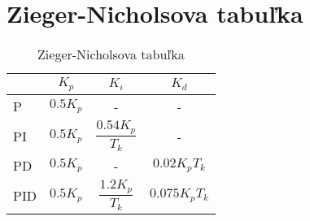 \chapter{Zieger-Nicholsova tabuľka}
\begin{table}[h]
\centering
\label{tab:Zieger-Nichols}
\begin{tabular}{|m{2cm}|c|c|c|}
\hline
 & \textbf{$K_p$} & \textbf{$K_i$} & \textbf{$K_d$}\\
\hline
P & $0.5K_p$ & - & - \\
PI & $0.5K_p$ & $\dfrac{0.54K_p}{T_k}$ & - \\
PD & $0.5K_p$ & - & $0.02K_pT_k$ \\
PID & $0.5K_p$ & $\dfrac{1.2K_p}{T_k}$ & $0.075K_pT_k$ \\
\hline
\end{tabular}
\caption{Zieger-Nicholsova tabuľka}
\end{table}